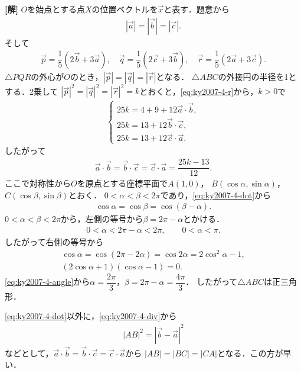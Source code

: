 \documentclass[../main.tex]{subfiles}
\begin{document}
{\bf [解]}
$O$を始点とする点$X$の位置ベクトルを$\vec{x}$と表す．題意から
\begin{align}|\vec{a}|=|\vec{b}|=|\vec{c}|.\label{eq:ky2007-4-r}
\end{align}
そして
\begin{align}
  \vec{p}=\dfrac{1}{5}(2\vec{b}+3\vec{a}),\quad
  \vec{q}=\dfrac{1}{5}(2\vec{c}+3\vec{b}),\quad
  \vec{r}=\dfrac{1}{5}(2\vec{a}+3\vec{c}).\label{eq:ky2007-4-div}
\end{align}
$\triangle PQR$の外心が$O$のとき，$|\vec{p}|=|\vec{q}|=|\vec{r}|$となる．
$\triangle ABC$の外接円の半径を1とする．2乗して
$|\vec{p}|^2=|\vec{q}|^2=|\vec{r}|^2=k$とおくと，\cref{eq:ky2007-4-r}から，$k>0$で
\begin{align}
  \begin{cases}
    25k=4+9+12\vec{a}\cdot\vec{b},\\
    25k=13+12\vec{b}\cdot\vec{c},\\
    25k=13+12\vec{c}\cdot\vec{a}.
  \end{cases}
\end{align}
したがって
\begin{align}
  \vec{a}\cdot\vec{b}=\vec{b}\cdot\vec{c}=\vec{c}\cdot\vec{a}=\dfrac{25k-13}{12}.
  \label{eq:ky2007-4-dot}
\end{align}
ここで対称性から$O$を原点とする座標平面で$A(1,0)$，
$B(\cos\alpha,\sin\alpha)$，$C(\cos\beta,\sin\beta)$とおく．
$0<\alpha<\beta<2\pi$であり，\cref{eq:ky2007-4-dot}から
\begin{align}\cos\alpha=\cos\beta=\cos(\beta-\alpha).
\end{align}
$0<\alpha<\beta<2\pi$から，左側の等号から$\beta=2\pi-\alpha$とかける．
\begin{align}0<\alpha<2\pi-\alpha<2\pi,\qquad0<\alpha<\pi.\label{eq:ky2007-4-angle}
\end{align}
したがって右側の等号から
\begin{align}
  \cos\alpha=\cos(2\pi-2\alpha)=\cos2\alpha=2\cos^2\alpha-1,\\
  (2\cos\alpha+1)(\cos\alpha-1)=0.
\end{align}
\cref{eq:ky2007-4-angle}から$\alpha=\dfrac{2\pi}{3}$，$\beta=2\pi-\alpha=\dfrac{4\pi}{3}$．
したがって$\triangle ABC$は正三角形．

\medskip\noindent{\bf [別解]}
\cref{eq:ky2007-4-dot}以外に，\cref{eq:ky2007-4-div}から
\begin{align}|AB|^2=|\vec{b}-\vec{a}|^2
\end{align}
などとして，$\vec{a}\cdot\vec{b}=\vec{b}\cdot\vec{c}=\vec{c}\cdot\vec{a}$から
$|AB|=|BC|=|CA|$となる．この方が早い．
\newpage
\end{document}
